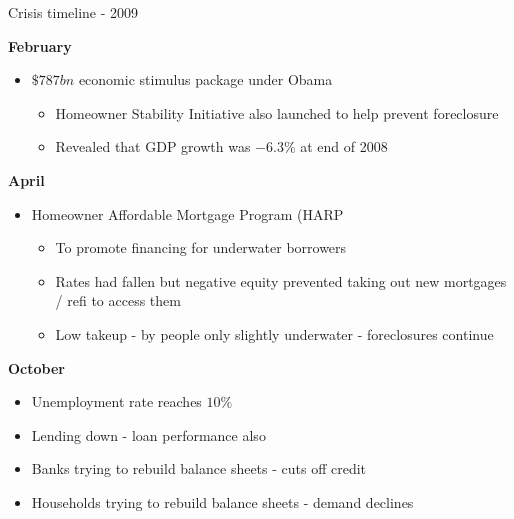 \begin{frame}{Crisis timeline - 2009}

\textbf{February}
	\begin{itemize}
	\item[]	$\$787bn$ economic stimulus package under Obama
		\begin{itemize}
		\item	Homeowner Stability Initiative also launched to help prevent foreclosure
		\item	Revealed that GDP growth was $-6.3\%$ at end of 2008
		\end{itemize}
	\end{itemize}
\vspace{1mm}
\textbf{April}
	\begin{itemize}
	\item[]	Homeowner Affordable Mortgage Program (HARP
		\begin{itemize}
		\item	To promote financing for underwater borrowers
		\item	Rates had fallen but negative equity prevented taking out new mortgages / refi to access them
		\item	Low takeup - by people only slightly underwater - foreclosures continue
		\end{itemize}
	\end{itemize}
\vspace{1mm}
\textbf{October}
	\begin{itemize}
	\item	Unemployment rate reaches $10\%$
	\item	Lending down - loan performance also
	\item	Banks trying to rebuild balance sheets - cuts off credit
	\item	Households trying to rebuild balance sheets - demand declines
	\end{itemize}

\end{frame}



